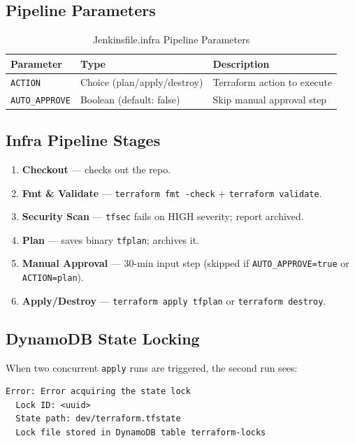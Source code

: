 \documentclass[12pt,a4paper]{article}
\begin{document}
\subsection{Pipeline Parameters}

\begin{table}[H]
  \centering
  \caption{Jenkinsfile.infra Pipeline Parameters}
  \label{tab:infra-params}
  \begin{tabularx}{\linewidth}{llX}
    \toprule
    \textbf{Parameter} & \textbf{Type} & \textbf{Description} \\
    \midrule
    \texttt{ACTION}       & Choice (plan/apply/destroy) & Terraform action to execute \\
    \texttt{AUTO\_APPROVE} & Boolean (default: false) & Skip manual approval step \\
    \bottomrule
  \end{tabularx}
\end{table}

\subsection{Infra Pipeline Stages}

\begin{enumerate}[leftmargin=*]
  \item \textbf{Checkout} — checks out the repo.
  \item \textbf{Fmt \& Validate} — \texttt{terraform fmt -check} + \texttt{terraform validate}.
  \item \textbf{Security Scan} — \texttt{tfsec} fails on HIGH severity; report archived.
  \item \textbf{Plan} — saves binary \texttt{tfplan}; archives it.
  \item \textbf{Manual Approval} — 30-min input step (skipped if \texttt{AUTO\_APPROVE=true} or \texttt{ACTION=plan}).
  \item \textbf{Apply/Destroy} — \texttt{terraform apply tfplan} or \texttt{terraform destroy}.
\end{enumerate}

\subsection{DynamoDB State Locking}

When two concurrent \texttt{apply} runs are triggered, the second run sees:
\begin{verbatim}
Error: Error acquiring the state lock
  Lock ID: <uuid>
  State path: dev/terraform.tfstate
  Lock file stored in DynamoDB table terraform-locks
\end{verbatim}
\end{document}
